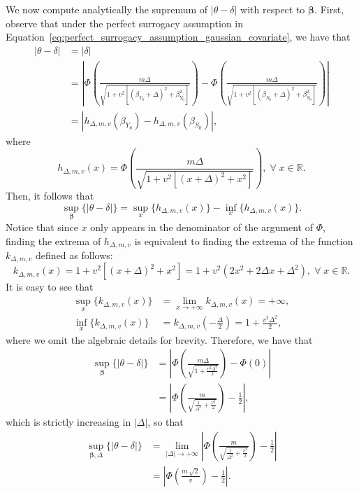 \documentclass[referee,usenatbib]{biom}
\begin{document}
We now compute analytically the supremum of \(|\theta - \delta|\) with respect to \(\boldsymbol{\beta}\). First, observe that under the perfect surrogacy assumption in Equation~\eqref{eq:perfect_surrogacy_assumption_gaussian_covariate}, we have that
\begin{align*}
    |\theta - \delta| & = |\delta| \\
    & = \left| \Phi \left( \frac{m \Delta}{\sqrt{1 + v^2 [(\beta_{Y_{0}} + \Delta)^2 + \beta_{Y_{0}}^2]}} \right) - \Phi \left( \frac{m \Delta}{\sqrt{1 + v^2 [(\beta_{S_{0}} + \Delta)^2 + \beta_{S_{0}}^2]}} \right) \right| \\
    & = | h_{\Delta, m, v} (\beta_{Y_{0}}) - h_{\Delta, m, v}(\beta_{S_{0}}) |,
\end{align*}
where
\begin{equation*}
    h_{\Delta, m, v}(x) = \Phi \left( \frac{m \Delta}{\sqrt{1 + v^2 [(x + \Delta)^2 + x^2]}} \right), \; \forall \; x \in \mathbb{R}.
\end{equation*}
Then, it follows that
\begin{equation*}
    \sup_{\boldsymbol{\beta}} \{ |\theta - \delta| \} = \sup_{x} \{ h_{\Delta, m, v}(x) \} - \inf_{x} \{ h_{\Delta, m, v}(x) \}.
\end{equation*}
Notice that since \(x\) only appears in the denominator of the argument of \(\Phi\), finding the extrema of \(h_{\Delta, m, v}\) is equivalent to finding the extrema of the function \(k_{\Delta, m, v}\) defined as follows:
\begin{equation*}
    k_{\Delta, m, v}(x) = 1 + v^2 [(x + \Delta)^2 + x^2] = 1 + v^2 (2 x^2 + 2 \Delta x + \Delta^2), \; \forall \; x \in \mathbb{R}.
\end{equation*}
It is easy to see that
\begin{align*}
    \sup_{x} \{ k_{\Delta, m, v}(x) \} & = \lim_{x \to +\infty} k_{\Delta, m, v}(x) = +\infty, \\
    \inf_{x} \{ k_{\Delta, m, v}(x) \} & = k_{\Delta, m, v}\!\left(-\frac{\Delta}{2}\right) = 1 + \frac{v^2 \Delta^2}{2},
\end{align*}
where we omit the algebraic details for brevity. Therefore, we have that
\begin{align*}
    \sup_{\boldsymbol{\beta}} \{ |\theta - \delta| \} & = \left| \Phi \left( \frac{m \Delta}{\sqrt{1 + \frac{v^2 \Delta^2}{2}}} \right) - \Phi \left( 0 \right) \right| \\
    & = \left| \Phi \left( \frac{m}{\sqrt{\frac{1}{\Delta^2} + \frac{v^2}{2}}} \right) - \frac{1}{2} \right|,
\end{align*}
which is strictly increasing in \( | \Delta | \), so that
\begin{align*}
    \sup_{\boldsymbol{\beta}, \Delta} \{ |\theta - \delta| \} & = \lim_{|\Delta| \to +\infty} \left| \Phi \left( \frac{m}{\sqrt{\frac{1}{\Delta^2} + \frac{v^2}{2}}} \right) - \frac{1}{2} \right| \\
    & = \left| \Phi \left( \frac{m \, \sqrt{2}}{v} \right) - \frac{1}{2} \right|.
\end{align*}
\end{document}
